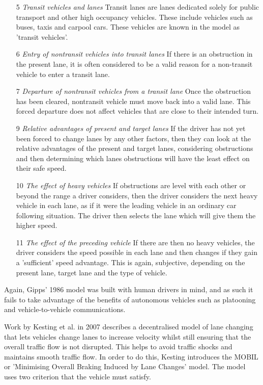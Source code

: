 \begin{enumerate}
\item[5] \textit{Transit vehicles and lanes}
Transit lanes are lanes dedicated solely for public transport and other high occupancy vehicles. These include vehicles such as buses, taxis and carpool cars. These vehicles are known in the model as 'transit vehicles'.
\item[6] \textit{Entry of nontransit vehicles into transit lanes}
If there is an obstruction in the present lane, it is often considered to be a valid reason for a non-transit vehicle to enter a transit lane. 
\item[7] \textit{Departure of nontransit vehicles from a transit lane}
Once the obstruction has been cleared, nontransit vehicle must move back into a valid lane. This forced departure does not affect vehicles that are close to their intended turn.
\item[9] \textit{Relative advantages of present and target lanes}
If the driver has not yet been forced to change lanes by any other factors, then they can look at the relative advantages of the present and target lanes, considering obstructions and then determining which lanes obstructions will have the least effect on their safe speed.
\item[10] \textit{The effect of heavy vehicles} 
If obstructions are level with each other or beyond the range a driver considers, then the driver considers the next heavy vehicle in each lane, as if it were the leading vehicle in an ordinary car following situation. The driver then selects the lane which will give them the higher speed.
\item[11] \textit{The effect of the preceding vehicle}
If there are then no heavy vehicles, the driver considers the speed possible in each lane and then changes if they gain a 'sufficient' speed advantage. This is again, subjective, depending on the present lane, target lane and the type of vehicle.
\end{enumerate}

Again, Gipps' 1986 model was built with human drivers in mind, and as such it fails to take advantage of the benefits of autonomous vehicles such as platooning and vehicle-to-vehicle communications.

Work by Kesting et al. in 2007 \citep{Kesting2007} describes a decentralised model of lane changing that lets vehicles change lanes to increase velocity whilst still ensuring that the overall traffic flow is not disrupted. This helps to avoid traffic shocks and maintains smooth traffic flow. In order to do this, Kesting introduces the MOBIL or 'Minimising Overall Braking Induced by Lane Changes' model. The model uses two criterion that the vehicle must satisfy.

